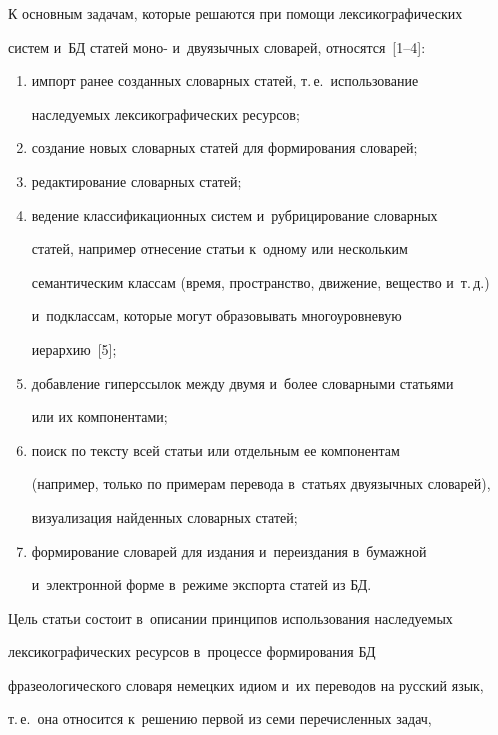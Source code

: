    К основным задачам, которые решаются при помощи лексикографических 

систем и~БД статей моно- и~двуязычных словарей, относятся~[1--4]:

   \begin{enumerate}[(1)]

\item импорт ранее созданных словарных статей, т.\,е.\ использование 

наследуемых лексикографических ресурсов;

\item создание новых словарных статей для формирования словарей;

\item редактирование словарных статей;

\item ведение классификационных систем и~рубрицирование словарных 

статей, например отнесение статьи к~одному или нескольким 

семантическим классам (время, пространство, движение, вещество и~т.\,д.) 

и~подклассам, которые могут образовывать многоуровневую 

иерархию~[5];

\item добавление гиперссылок между двумя и~более словарными статьями 

или их компонентами;

\item поиск по тексту всей статьи или отдельным ее компонентам 

(например, только по примерам перевода в~статьях двуязычных словарей), 

визуализация найденных словарных статей;

\item формирование словарей для издания и~переиздания в~бумажной 

и~электронной форме в~режиме экспорта статей из БД.

\end{enumerate}



   Цель статьи состоит в~описании принципов использования наследуемых 

лексикографических ресурсов в~процессе формирования БД 

фразеологического словаря немецких идиом и~их переводов на русский язык, 

т.\,е.\ она относится к~решению первой из семи перечисленных задач, 

